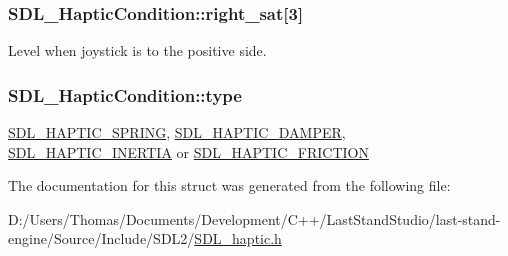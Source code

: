 \subsubsection[{right\+\_\+sat}]{ S\+D\+L\+\_\+\+Haptic\+Condition\+::right\+\_\+sat\mbox{[}3\mbox{]}}\label{structSDL__HapticCondition_a90427a1e0d464b4b53abc1d419c97b2e}
Level when joystick is to the positive side. \hypertarget{structSDL__HapticCondition_a7be55a9a86c05dd1a54a3006781cfa6f}{}
\subsubsection[{type}]{ S\+D\+L\+\_\+\+Haptic\+Condition\+::type}\label{structSDL__HapticCondition_a7be55a9a86c05dd1a54a3006781cfa6f}
\hyperlink{SDL__haptic_8h_a3b52d4700380085e2b5d87bb20320fb1}{S\+D\+L\+\_\+\+H\+A\+P\+T\+I\+C\+\_\+\+S\+P\+R\+I\+N\+G}, \hyperlink{SDL__haptic_8h_a69522f261973e3ea4273486141320a87}{S\+D\+L\+\_\+\+H\+A\+P\+T\+I\+C\+\_\+\+D\+A\+M\+P\+E\+R}, \hyperlink{SDL__haptic_8h_a14b807471589120395aec28293cf6642}{S\+D\+L\+\_\+\+H\+A\+P\+T\+I\+C\+\_\+\+I\+N\+E\+R\+T\+I\+A} or \hyperlink{SDL__haptic_8h_a98a5011311168d63921aaac21403a4d8}{S\+D\+L\+\_\+\+H\+A\+P\+T\+I\+C\+\_\+\+F\+R\+I\+C\+T\+I\+O\+N} 

The documentation for this struct was generated from the following file\+:\begin{DoxyCompactItemize}
\item 
D\+:/\+Users/\+Thomas/\+Documents/\+Development/\+C++/\+Last\+Stand\+Studio/last-\/stand-\/engine/\+Source/\+Include/\+S\+D\+L2/\hyperlink{SDL__haptic_8h}{S\+D\+L\+\_\+haptic.\+h}\end{DoxyCompactItemize}
